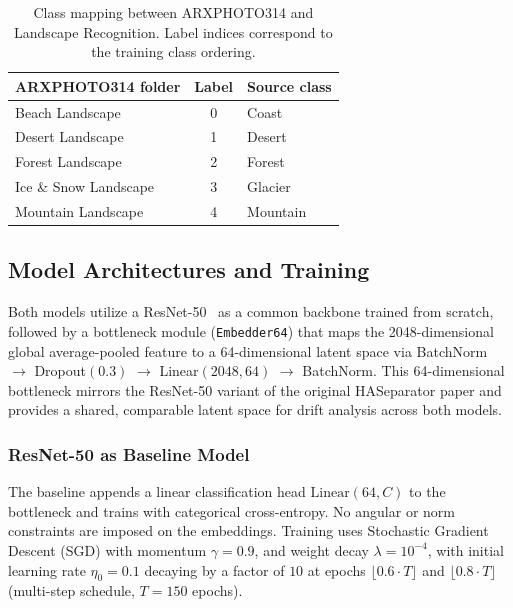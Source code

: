 \begin{table}[htbp]
\centering
\caption{Class mapping between ARXPHOTO314 and
         Landscape Recognition.
         Label indices correspond to the training class ordering.}
\label{tab:classmap}
\renewcommand{\arraystretch}{1.25}
\begin{tabular}{@{} l c l @{}}
\toprule
\textbf{ARXPHOTO314 folder} & \textbf{Label} & \textbf{Source class} \\
\midrule
Beach Landscape       & 0 & Coast    \\
Desert Landscape      & 1 & Desert   \\
Forest Landscape      & 2 & Forest   \\
Ice \& Snow Landscape & 3 & Glacier  \\
Mountain Landscape    & 4 & Mountain \\
\bottomrule
\end{tabular}
\end{table}


\subsection{Model Architectures and Training}
\label{sec:training}

Both models utilize a ResNet-50~\cite{he-zhang-etal:2016} as a common backbone trained from scratch, followed by a bottleneck module (\texttt{Embedder64}) that maps the
2048-dimensional global average-pooled feature to a
64-dimensional latent space via BatchNorm $\to$ Dropout$(0.3)$
$\to$ Linear$(2048, 64)$ $\to$ BatchNorm.
This 64-dimensional bottleneck mirrors the ResNet-50 variant
of the original HASeparator paper \cite{kansizoglou-santavas-etal:2020}
and provides a shared, comparable latent space for drift analysis
across both models.

\subsubsection{ResNet-50 as Baseline Model}

The baseline appends a linear classification head
$\mathrm{Linear}(64, C)$ to the bottleneck and trains with
categorical cross-entropy.
No angular or norm constraints are imposed on the embeddings.
Training uses Stochastic Gradient Descent (SGD) with
momentum $\gamma = 0.9$, and
weight decay $\lambda = 10^{-4}$, with initial learning rate
$\eta_0 = 0.1$ decaying by a factor of $10$ at epochs
$\lfloor 0.6 \cdot T \rfloor$ and $\lfloor 0.8 \cdot T \rfloor$
(multi-step schedule, $T = 150$ epochs).

